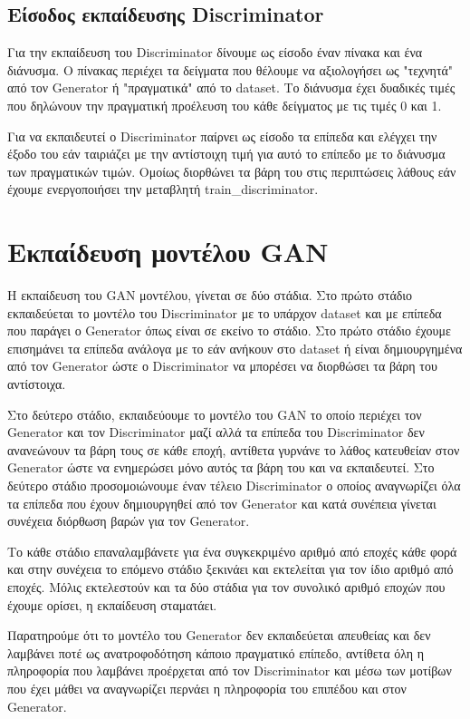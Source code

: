 \subsection{Είσοδος εκπαίδευσης Discriminator}
Για την εκπαίδευση του Discriminator δίνουμε ως είσοδο έναν πίνακα και ένα διάνυσμα. Ο πίνακας περιέχει τα δείγματα που θέλουμε να αξιολογήσει ως "τεχνητά" από τον Generator ή "πραγματικά" από το dataset. Το διάνυσμα έχει δυαδικές τιμές που δηλώνουν την πραγματική προέλευση του κάθε δείγματος με τις τιμές 0 και 1.
\par
Για να εκπαιδευτεί ο Discriminator παίρνει ως είσοδο τα επίπεδα και ελέγχει την έξοδο του εάν ταιριάζει με την αντίστοιχη τιμή για αυτό το επίπεδο με το διάνυσμα των πραγματικών τιμών. Ομοίως διορθώνει τα βάρη του στις περιπτώσεις λάθους εάν έχουμε ενεργοποιήσει την μεταβλητή train\_discriminator.

\section{Εκπαίδευση μοντέλου GAN}
\par
Η εκπαίδευση του GAN μοντέλου, γίνεται σε δύο στάδια. Στο πρώτο στάδιο εκπαιδεύεται το μοντέλο του Discriminator με το υπάρχον dataset και με επίπεδα που παράγει ο Generator όπως είναι σε εκείνο το στάδιο. Στο πρώτο στάδιο έχουμε επισημάνει τα επίπεδα ανάλογα με το εάν ανήκουν στο dataset ή είναι δημιουργημένα από τον Generator ώστε ο Discriminator να μπορέσει να διορθώσει τα βάρη του αντίστοιχα.
\par
Στο δεύτερο στάδιο, εκπαιδεύουμε το μοντέλο του GAN το οποίο περιέχει τον Generator και τον Discriminator μαζί αλλά τα επίπεδα του Discriminator δεν ανανεώνουν τα βάρη τους σε κάθε εποχή, αντίθετα γυρνάνε το λάθος κατευθείαν στον Generator ώστε να ενημερώσει μόνο αυτός τα βάρη του και να εκπαιδευτεί. Στο δεύτερο στάδιο προσομοιώνουμε έναν τέλειο Discriminator ο οποίος αναγνωρίζει όλα τα επίπεδα που έχουν δημιουργηθεί από τον Generator και κατά συνέπεια γίνεται συνέχεια διόρθωση βαρών για τον Generator.
\par
Το κάθε στάδιο επαναλαμβάνετε για ένα συγκεκριμένο αριθμό από εποχές κάθε φορά και στην συνέχεια το επόμενο στάδιο ξεκινάει και εκτελείται για τον ίδιο αριθμό από εποχές. Μόλις εκτελεστούν και τα δύο στάδια για τον συνολικό αριθμό εποχών που έχουμε ορίσει, η εκπαίδευση σταματάει.
\par
Παρατηρούμε ότι το μοντέλο του Generator δεν εκπαιδεύεται απευθείας και δεν λαμβάνει ποτέ ως ανατροφοδότηση κάποιο πραγματικό επίπεδο, αντίθετα όλη η πληροφορία που λαμβάνει προέρχεται από τον Discriminator και μέσω των μοτίβων που έχει μάθει να αναγνωρίζει περνάει η πληροφορία του επιπέδου και στον Generator.


